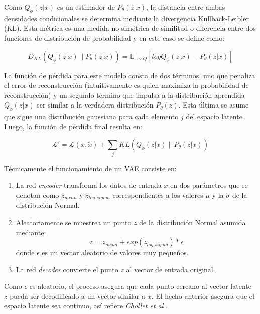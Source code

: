 Como $Q_{\phi}(z|x)$ es un estimador de $P_{\theta}(z|x)$, la distancia entre ambas densidades condicionales se determina mediante la divergencia Kullback-Leibler (KL). Esta métrica es una medida no simétrica de similitud o diferencia entre dos funciones de distribución de probabilidad y en este caso se define como:

\begin{equation}
	D_{KL} (Q_{\phi}(z|x) \parallel P_{\theta}(z|x)) = \mathbb{E}_{z \sim Q} \left [ log Q_{\phi}(z|x) - P_{\theta}(z|x) \right ]
\end{equation}

La función de pérdida para este modelo consta de dos términos, uno que penaliza el error de reconstrucción (intuitivamente es quien maximiza la probabilidad de reconstrucción) y un segundo término que impulsa a la  distribución aprendida $Q_{\phi}(z|x)$ ser similar a la verdadera distribución  $P_\theta(z)$. Esta última se asume que sigue una distribución gaussiana para cada elemento $j$ del espacio latente. Luego, la función de pérdida final resulta en:

\begin{equation}
\mathcal{L'} = \mathcal{L}(x, \tilde{x}) + \sum_{j} KL(Q_{\phi}(z|x) \parallel P_{\theta}(z|x))
\end{equation}


Técnicamente el funcionamiento de un VAE consiste en:
\begin{enumerate}
	\label{VAESteps}
	\item La red \textit{encoder} transforma los datos de entrada $x$ en dos parámetros que se denotan como $z_{mean}$ y $ z_{log {\_} sigma} $ correspondientes a los valores $\mu$ y la $\sigma$ de la distribución Normal.
	
	\item Aleatoriamente se muestrea un punto $z$ de la distribución Normal asumida mediante:  
	\begin{equation}
	z = z_{mean} + exp(z_{log{\_}sigma})*\epsilon
	\end{equation}
	donde $\epsilon$ es un vector aleatorio de valores muy pequeños.
	
	\item La red \textit{decoder} convierte el punto $z$ al vector de entrada original.  
\end{enumerate}

Como $\epsilon$ es aleatorio, el proceso asegura que cada punto cercano al vector latente $z$ pueda ser decodificado a un vector similar a $x$. El hecho anterior asegura que el espacio latente sea continuo, así refiere \textit{Chollet et al} \cite{Chollet}. 

